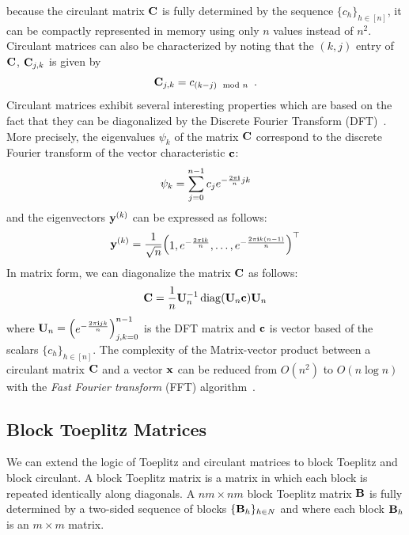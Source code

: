 \noindent
because the circulant matrix $\mathbf{C}$ is fully determined by the sequence $\{c_h\}_{h \in [n]}$, it can be compactly represented in memory using only $n$ values instead of $n^2$.
Circulant matrices can also be characterized by noting that the $(k,j)$ entry of $\mathbf{C}$, $\mathbf{C}_{j,k}$ is given by
\begin{equation}
  \Cmat_{j,k} = c_{\left(k-j\right) \mod n} \enspace.
\end{equation}
Circulant matrices exhibit several interesting properties which are based on the fact that they can be diagonalized by the Discrete Fourier Transform (DFT)~\cite{davis1979circulant}.
More precisely, the eigenvalues $\psi_k$ of the matrix $\mathbf{C}$ correspond to the discrete Fourier transform of the vector characteristic $\mathbf{c}$:
\begin{equation}
  \mathbf{\psi}_k = \sum_{j=0}^{n-1} c_j e^{-\frac{2 \pi \mathbf{i}}{n} jk}
\end{equation}
and the eigenvectors $\mathbf{y}^{(k)}$ can be expressed as follows:
\begin{equation}
  \yvec^{(k)} = \frac{1}{\sqrt{n}} \leftmatrix 1, e^{-\frac{2 \pi \ci k}{n}}, \dots, e^{-\frac{2 \pi \ci k(n-1)}{n}} \rightmatrix^\top
\end{equation}
In matrix form, we can diagonalize the matrix $\mathbf{C}$ as follows:
\begin{equation}
  \mathbf{C} = \frac{1}{n} \mathbf{U}_n^{-1} \operatorname*{diag}(\mathbf{U}_n \mathbf{c}) \mathbf{U}_n
\end{equation}
where $\mathbf{U}_n = \begin{pmatrix} e^{-\frac{2 \pi \mathbf{i} jk}{n}} \end{pmatrix}_{j,k = 0}^{n-1}$ is the DFT matrix and $\mathbf{c}$ is vector based of the scalars $\{c_h\}_{h \in [n]}$.
The complexity of the Matrix-vector product between a circulant matrix $\mathbf{C}$ and a vector $\mathbf{x}$ can be reduced from $O(n^2)$ to $O(n \log n)$ with the \emph{Fast Fourier transform} (FFT) algorithm~\cite{cooley1965algorithm}.



\subsection{Block Toeplitz Matrices}
\label{subsection:ch2-block_toeplitz_matrices}

We can extend the logic of Toeplitz and circulant matrices to block Toeplitz and block circulant.
A block Toeplitz matrix is a matrix in which each block is repeated identically along diagonals.
A $nm\times nm$ block Toeplitz matrix $\mathbf{B}$ is fully determined by a two-sided sequence of blocks $\{\mathbf{B}_h\}_{h \in N}$ and where each block $\mathbf{B}_h$ is an $m \times m$ matrix.  

